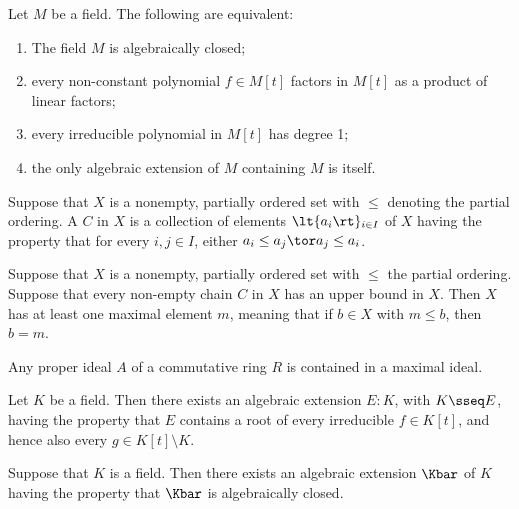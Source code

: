 \documentclass{article}
\begin{document}
  \begin{tlemma}
    Let $ M $ be a field.
    The following are equivalent: \begin{enumerate}[label=(\roman*)]
      \item The field $ M $ is algebraically closed;
      \item every non-constant polynomial $ f\in M[t] $ factors in $ M[t] $ as a product of linear factors;
      \item every irreducible polynomial in $ M[t] $ has degree 1;
      \item the only algebraic extension of $ M $ containing $ M $ is itself.
    \end{enumerate}
  \end{tlemma}

  \begin{tdefinition}[Chain]
    Suppose that $ X $ is a nonempty, partially ordered set with $ \leq $ denoting the partial ordering.
    A  $ C $ in $ X $ is a collection of elements $ \lt\{ a_i \rt\}_{i\in I} $ of $ X $ having the property that for every $ i,j\in I $, either $ a_i\leq a_j \tor a_j\leq a_i $.
  \end{tdefinition}

  \quad Suppose that $ X $ is a nonempty, partially ordered set with $ \leq $ the partial ordering.
  Suppose that every non-empty chain $ C $ in $ X $ has an upper bound in $ X $.
  Then $ X $ has at least one maximal element $ m $, meaning that if $ b\in X $ with $ m\leq b $, then $ b=m $.

  \begin{tproposition}
    Any proper ideal $ A $ of a commutative ring $ R $ is contained in a maximal ideal.
  \end{tproposition}

  \begin{tlemma}
    Let $ K $ be a field.
    Then there exists an algebraic extension $ E:K $, with $ K\sseq E $, having the property that $ E $ contains a root of every irreducible $ f\in K[t] $, and hence also every $ g\in K[t]\setminus K $.
  \end{tlemma}

  \begin{ttheorem}
    Suppose that $ K $ is a field.
    Then there exists an algebraic extension $ \Kbar $ of $ K $ having the property that $ \Kbar $ is algebraically closed.
  \end{ttheorem}
\end{document}
